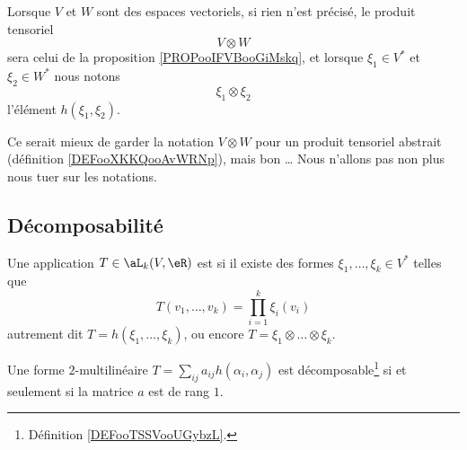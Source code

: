 \begin{normaltext}
	Lorsque \( V\) et \( W\) sont des espaces vectoriels, si rien n'est précisé, le produit tensoriel
	\begin{equation}
		V\otimes W
	\end{equation}
	sera celui de la proposition \ref{PROPooIFVBooGiMskq}, et lorsque \( \xi_1\in V^*\) et \( \xi_2\in W^*\) nous notons
	\begin{equation}
		\xi_1\otimes \xi_2
	\end{equation}
	l'élément \( h(\xi_1,\xi_2)\).

	Ce serait mieux de garder la notation \( V\otimes W\) pour un produit tensoriel abstrait (définition \ref{DEFooXKKQooAvWRNp}), mais bon \ldots{} Nous n'allons pas non plus nous tuer sur les notations.
\end{normaltext}

\subsection{Décomposabilité}

\begin{definition}		\label{DEFooTSSVooUGybzL}
	Une application \( T\in\aL_k(V,\eR)\) est  si il existe des formes \( \xi_1,\ldots,\xi_k\in V^*\) telles que
	\begin{equation}
		T(v_1,\ldots,v_k)=\prod_{i=1}^k\xi_i(v_i)
	\end{equation}
	autrement dit \( T=h(\xi_1,\ldots,\xi_k)\), ou encore \( T=\xi_1\otimes \ldots \otimes \xi_k\).
\end{definition}

\begin{lemma}		\label{LEMooLEIBooROVcim}
	Une forme \( 2\)-multilinéaire \( T=\sum_{ij}a_{ij}h(\alpha_i,\alpha_j)\) est décomposable\footnote{Définition \ref{DEFooTSSVooUGybzL}.} si et seulement si la matrice \( a\) est de rang \( 1\).
\end{lemma}

